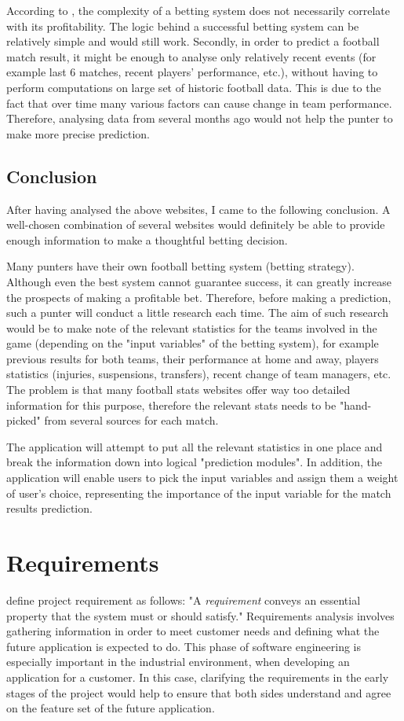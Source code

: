 According to \citet{art:simplebettingsystem}, the complexity of a betting system does not necessarily correlate with its profitability. The logic behind a successful betting system can be relatively simple and would still work. Secondly, in order to predict a football match result, it might be enough to analyse only relatively recent events (for example last 6 matches, recent players' performance, etc.), without having to perform computations on large set of historic football data. This is due to the fact that over time many various factors can cause change in team performance. Therefore, analysing data from several months ago would not help the punter to make more precise prediction.

\subsection{Conclusion}
After having analysed the above websites, I came to the following conclusion. A well-chosen combination of several websites would definitely be able to provide enough information to make a thoughtful betting decision.

Many punters have their own football betting system (betting strategy). Although even the best system cannot guarantee success, it can greatly increase the prospects of making a profitable bet. Therefore, before making a prediction, such a punter will conduct a little research each time. The aim of such research would be to make note of the relevant statistics for the teams involved in the game (depending on the "input variables" of the betting system), for example previous results for both teams, their performance at home and away, players statistics (injuries, suspensions, transfers), recent change of team managers, etc. The problem is that many football stats websites offer way too detailed information for this purpose, therefore the relevant stats needs to be "hand-picked" from several sources for each match. 
 	
The application will attempt to put all the relevant statistics in one place and break the information down into logical "prediction modules". In addition, the application will enable users to pick the input variables and assign them a weight of user's choice, representing the importance of the input variable for the match results prediction.
 
\section{Requirements}
\label{sec:requirements_req}
 \citet{book:radice1998software} define project requirement as follows: "A \emph{requirement} conveys an essential property that the system must or should satisfy." Requirements analysis involves gathering information in order to meet customer needs and defining what the future application is expected to do. 
This phase of software engineering is especially important in the industrial environment, when developing an application for a customer. In this case, clarifying the requirements in the early stages of the project would help to ensure that both sides understand and agree on the feature set of the future application. 

